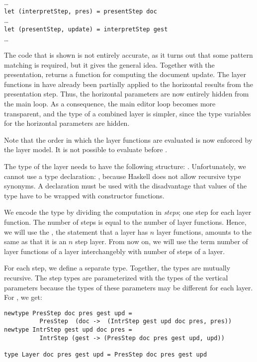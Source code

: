 \documentclass[preprint,natbib]{sigplanconf}
\begin{document}
\dots\\
{\tt let (interpretStep, pres) = presentStep doc}\\
\dots\\
{\tt let (presentStep, update) = interpretStep gest}\\
\dots

The code that is shown is not entirely accurate, as it turns out that some pattern matching is required, but it gives the general idea. Together with the presentation,  returns a function  for computing the document update. The layer functions in  have already been partially applied to the horizontal results from the presentation step. Thus, the horizontal parameters are now entirely hidden from the main loop.  As a consequence, the main editor loop becomes more transparent, and the type of a combined layer is simpler, since the type variables for the horizontal parameters are hidden.

\bc Note that the order in which the layer functions are evaluated is now enforced by the layer model. It is not possible to evaluate  before .  \ec



The type of the layer needs to have the following structure: 
.  Unfortunately, we cannot use a type declaration: , because Haskell does not allow recursive type synonyms. A  declaration must be used with the disadvantage that values of the type have to be wrapped with constructor functions.

We encode the type by dividing the computation in {\em steps}; one step for each layer function. The number of steps is equal to the number of layer functions. Hence, we will use the , the statement that a layer has $n$ layer functions, amounts to the same as that it is an $n$ step layer. From now on, we will use the term number of layer functions of a layer interchangebly with number of steps of a layer.

For each step, we define a separate type. Together, the types are mutually recursive. The step types are parameterized with the types of the vertical parameters because the types of these parameters may be different for each layer. For , we get:

\begin{small}
\begin{verbatim}
newtype PresStep doc pres gest upd = 
          PresStep  (doc ->  (IntrStep gest upd doc pres, pres))
newtype IntrStep gest upd doc pres = 
          IntrStep (gest -> (PresStep doc pres gest upd, upd)) 

type Layer doc pres gest upd = PresStep doc pres gest upd  
\end{verbatim}
\end{small}
\end{document}
